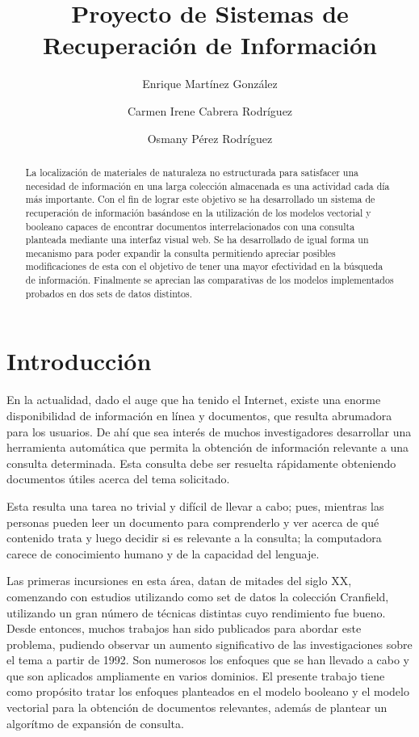 \documentclass{llncs}
\title{Proyecto de Sistemas de Recuperación de Información}
\author{Enrique Martínez González \and Carmen Irene Cabrera Rodríguez \and Osmany Pérez Rodríguez}
\institute{C512}
\begin{document}
\maketitle

\begin{abstract}
    La localización de materiales de naturaleza no estructurada para satisfacer una necesidad de información en una larga colección almacenada es una actividad cada día más importante. Con el fin de lograr este objetivo se ha desarrollado un sistema de recuperación de información basándose en la utilización de los modelos vectorial y booleano capaces de encontrar documentos interrelacionados con una consulta planteada mediante una interfaz visual web. Se ha desarrollado de igual forma un mecanismo para poder expandir la consulta permitiendo apreciar posibles modificaciones de esta con el objetivo de tener una mayor efectividad en la búsqueda de información. Finalmente se aprecian las comparativas de los modelos implementados probados en dos sets de datos distintos.
\end{abstract}



\newpage
\tableofcontents
\newpage


\section{Introducción}
En la actualidad, dado el auge que ha tenido el Internet, existe una enorme disponibilidad de información en línea y documentos, que resulta abrumadora para los usuarios. De ahí que sea interés de muchos investigadores desarrollar una herramienta automática que permita la obtención de información relevante a una consulta determinada. Esta consulta debe ser resuelta rápidamente obteniendo documentos útiles acerca del tema solicitado.

Esta resulta una tarea no trivial y difícil de llevar a cabo; pues, mientras las personas pueden leer un documento para comprenderlo y ver acerca de qué contenido trata y luego decidir si es relevante a la consulta; la computadora carece de conocimiento humano y de la capacidad del lenguaje.

Las primeras incursiones en esta área, datan de mitades del siglo XX, comenzando con estudios utilizando como set de datos la colección Cranfield, utilizando un gran número de técnicas distintas cuyo rendimiento fue bueno. Desde entonces, muchos trabajos han sido publicados para abordar este problema, pudiendo observar un aumento significativo de las investigaciones sobre el tema a partir de 1992. Son numerosos los enfoques que se han llevado a cabo y que son aplicados ampliamente en
varios dominios. El presente trabajo tiene como propósito tratar los enfoques planteados en el modelo booleano y el modelo vectorial para la obtención de documentos relevantes, además de plantear un algorítmo de expansión de consulta.
\end{document}

